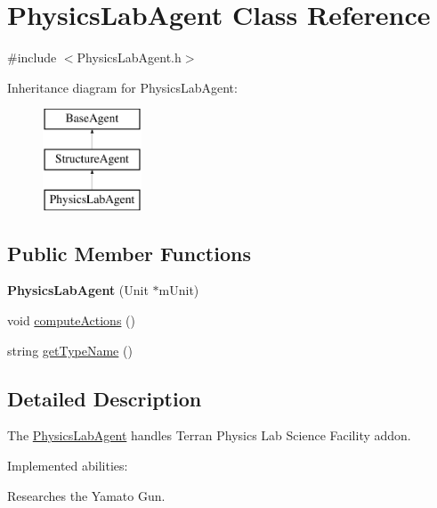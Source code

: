 \hypertarget{class_physics_lab_agent}{
\section{PhysicsLabAgent Class Reference}
\label{class_physics_lab_agent}
}


{\ttfamily \#include $<$PhysicsLabAgent.h$>$}

Inheritance diagram for PhysicsLabAgent:\begin{figure}[H]
\begin{center}
\leavevmode
\includegraphics[height=3.000000cm]{class_physics_lab_agent}
\end{center}
\end{figure}
\subsection*{Public Member Functions}
\begin{DoxyCompactItemize}
\item 
\hypertarget{class_physics_lab_agent_a17855cf781e69442f6a3d4cb353d5f37}{
{\bfseries PhysicsLabAgent} (Unit $\ast$mUnit)}
\label{class_physics_lab_agent_a17855cf781e69442f6a3d4cb353d5f37}

\item 
void \hyperlink{class_physics_lab_agent_a13da053914850d228c602d5bf138b428}{computeActions} ()
\item 
string \hyperlink{class_physics_lab_agent_a069af870ed80499cdf43e297de015767}{getTypeName} ()
\end{DoxyCompactItemize}


\subsection{Detailed Description}
The \hyperlink{class_physics_lab_agent}{PhysicsLabAgent} handles Terran Physics Lab Science Facility addon.

Implemented abilities:
\begin{DoxyItemize}
\item Researches the Yamato Gun.
\end{DoxyItemize}

